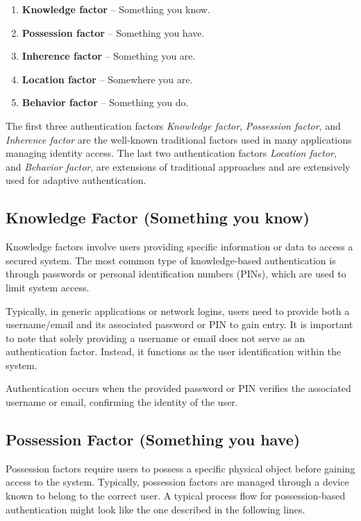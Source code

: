 \begin{enumerate}
    \item \textbf{Knowledge factor} -- Something you know.
    \item \textbf{Possession factor} -- Something you have.
    \item \textbf{Inherence factor} -- Something you are.
    \item \textbf{Location factor} -- Somewhere you are.
    \item \textbf{Behavior factor} -- Something you do.
\end{enumerate}

The first three authentication factors \textit{Knowledge factor}, \textit{Possession factor}, and \textit{Inherence factor} are the well-known traditional factors used in many applications managing identity access.
The last two authentication factors \textit{Location factor}, and \textit{Behavior factor}, are extensions of traditional approaches and are extensively used for adaptive authentication.\cite{auth-factors-descope}  

\newpage
\subsection{Knowledge Factor (Something you know)}
Knowledge factors involve users providing specific information or data to access a secured system.
The most common type of knowledge-based authentication is through passwords or personal identification numbers (PINs), which are used to limit system access.

Typically, in generic applications or network logins, users need to provide both a username/email and its associated password or PIN to gain entry. It is important to note that solely providing a username or email does not serve as an authentication factor.
Instead, it functions as the user identification within the system.

Authentication occurs when the provided password or PIN verifies the associated username or email, confirming the identity of the user.

\subsection{Possession Factor (Something you have)}
Possession factors require users to possess a specific physical object before gaining access to the system.
Typically, possession factors are managed through a device known to belong to the correct user.
A typical process flow for possession-based authentication might look like the one described in the following lines.

